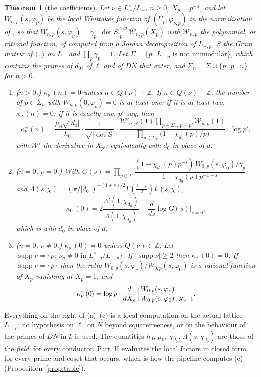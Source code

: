 \documentclass[11pt,reqno]{amsart}
\theoremstyle{plain}
\newtheorem{theorem}{Theorem}[section]
\theoremstyle{definition}
\DeclareMathOperator{\supp}{supp}
\newcommand{\Z}{\mathbb{Z}}
\newcommand{\Lm}{L_{-}}
\begin{document}
\begin{theorem}[the coefficients]\label{thm:kappa}
Let $\nu\in\Lm^\vee/\Lm$, $n\ge0$, $X_p=p^{-s}$, and let $W_{n,p}(s,\varphi_\nu)$ be the local
Whittaker function of $(U_p,\varphi_{\nu,p})$ in the normalisation of \cite[(4.4)]{KY}, so that
$W_{n,p}(s,\varphi_\nu)=\gamma_p\,|\det S|_p^{1/2}\,\mathcal W_{n,p}(X_p)$ with $\mathcal W_{n,p}$
the polynomial, or rational function, of \cite[Thms.~4.3, 4.4]{KY} computed from a Jordan
decomposition of $L_{-,p}$, $S$ the Gram matrix of $\langle\,,\rangle$ on $\Lm$ and $\prod_p\gamma_p=1$.
Let $\Sigma=\{p:\ L_{-,p}\text{ is not unimodular}\}$, which contains the primes of $d_0$, of
$\ell$ and of $DN$ that enter, and $\Sigma_n=\Sigma\cup\{p:\ p\mid n\}$ for $n>0$.
\begin{enumerate}
\item[(a)] ($n>0$.) $\kappa^-_\nu(n)=0$ unless $n\in Q(\nu)+\Z$. If $n\in Q(\nu)+\Z$, the number
of $p\in\Sigma_n$ with $W_{n,p}(0,\varphi_\nu)=0$ is at least one; if it is at least two,
$\kappa^-_\nu(n)=0$; if it is exactly one, $p'$ say, then
\[
  \kappa^-_\nu(n)=\frac{\mu_0\sqrt{|d_0|}}{h_0}\cdot\frac1{\sqrt{|\det S|}}\cdot
  \frac{\mathcal W'_{n,p'}(1)\prod_{p\in\Sigma_n,\,p\ne p'}\mathcal W_{n,p}(1)}
       {\prod_{p\in\Sigma_n}\bigl(1-\chi_{d_0}(p)/p\bigr)}\cdot\log p' ,
\]
with $\mathcal W'$ the derivative in $X_{p'}$; equivalently \cite[Lemma~16]{Yang} with $d_0$ in
place of $d$.
\item[(b)] ($n=0$, $\nu=0$.) With $G(s)=\prod_{p\in\Sigma}\dfrac{(1-\chi_{d_0}(p)p^{-s})\,
W_{0,p}(s,\varphi_0)/\gamma_p}{1-\chi_{d_0}(p)p^{-1-s}}$ and $\Lambda(s,\chi)=
(\pi/|d_0|)^{-(1+s)/2}\Gamma(\tfrac{1+s}2)L(s,\chi)$,
\[
  \kappa^-_0(0)=2\frac{\Lambda'(1,\chi_{d_0})}{\Lambda(1,\chi_{d_0})}-\frac{d}{ds}\log G(s)\Big|_{s=0},
\]
which is \cite[Lemma~17]{Yang} with $d_0$ in place of $d$.
\item[(c)] ($n=0$, $\nu\ne0$.) $\kappa^-_\nu(0)=0$ unless $Q(\nu)\in\Z$. Let
$\supp\nu=\{p:\ \nu_p\neq0\text{ in }L_{-,p}^\vee/L_{-,p}\}$. If $|\supp\nu|\ge2$ then
$\kappa^-_\nu(0)=0$. If $\supp\nu=\{p\}$ then the ratio $W_{0,p}(s,\varphi_\nu)/W_{0,p}(s,\varphi_0)$
is a rational function of $X_p$ vanishing at $X_p=1$, and
\[
  \kappa^-_\nu(0)=\log p\cdot\frac{d}{dX_p}\Bigl[\frac{W_{0,p}(s,\varphi_\nu)}{W_{0,p}(s,\varphi_0)}
  \Bigr]_{X_p=1}.
\]
\end{enumerate}
\end{theorem}

Everything on the right of (a)--(c) is a local computation on the actual lattice $L_{-,p}$; no
hypothesis on $\ell$, on $N$ beyond squarefreeness, or on the behaviour of the primes of $DN$ in
$k$ is used. The quantities $h_0$, $\mu_0$, $\chi_{d_0}$, $\Lambda(s,\chi_{d_0})$ are those of the
\emph{field}, for every conductor. Part~II evaluates the local factors in closed form for every
prime and coset that occurs, which is how the pipeline computes (c) (Proposition~\ref{prop:table}).
\end{document}

